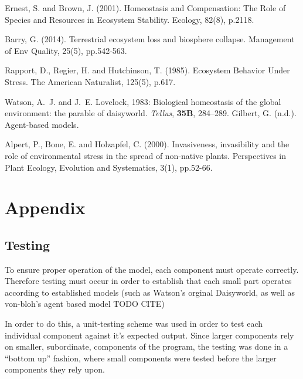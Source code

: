 \documentclass[12pt]{article}
\begin{document}
\begin{thebibliography}{99}
    Ernest, S. and Brown, J. (2001). Homeostasis and Compensation: The
    Role of Species and Resources in Ecosystem Stability. Ecology,
    82(8), p.2118.

   Barry, G. (2014). Terrestrial ecosystem loss
    and biosphere collapse. Management of Env Quality, 25(5), pp.542-563.

  Rapport, D., Regier, H. and Hutchinson, T. (1985). Ecosystem
  Behavior Under Stress. The American Naturalist, 125(5), p.617.

  Watson, A.~J. and J.~E. Lovelock, 1983: Biological homeostasis of the global
  environment: the parable of daisyworld. {\em Tellus}, {\bf 35B},
  284--289.
  Gilbert, G. (n.d.). Agent-based models.

Alpert, P., Bone, E. and Holzapfel, C. (2000). Invasiveness, invasibility and the role of environmental stress in the spread of non-native plants. Perspectives in Plant Ecology, Evolution and Systematics, 3(1), pp.52-66.

\end{thebibliography}

\section{Appendix}
\subsection{Testing}
To ensure proper operation of the model, each component must operate
correctly. Therefore testing must occur in order to establish that
each small part operates according to established models (such as
Watson's orginal Daisyworld\cite{watson1983}, as well as von-bloh's
agent based model TODO CITE)

In order to do this, a unit-testing scheme was used in order to test
each individual component against it's expected output. Since larger
components rely on smaller, subordinate, components of the program,
the testing was done in a ``bottom up'' fashion, where small
components were tested before the larger components they rely upon.
\end{document}
